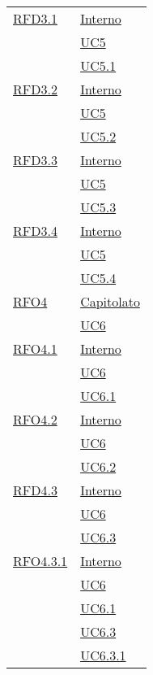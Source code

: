 \begin{longtable}{|>{\centering}m{5cm}|m{5cm}<{\centering}|}
\hyperlink{RFD3.1}{RFD3.1} 
& \hyperlink{Interno}{Interno}\\
& \hyperref[UC5]{UC5}\\
& \hyperref[UC5.1]{UC5.1}\\ \hline

\hyperlink{RFD3.2}{RFD3.2} 
& \hyperlink{Interno}{Interno}\\
& \hyperref[UC5]{UC5}\\
& \hyperref[UC5.2]{UC5.2}\\ \hline

\hyperlink{RFD3.3}{RFD3.3} 
& \hyperlink{Interno}{Interno}\\
& \hyperref[UC5]{UC5}\\
& \hyperref[UC5.3]{UC5.3}\\ \hline

\hyperlink{RFD3.4}{RFD3.4} 
& \hyperlink{Interno}{Interno}\\
& \hyperref[UC5]{UC5}\\
& \hyperref[UC5.4]{UC5.4}\\ \hline

\hyperlink{RFO4}{RFO4} 
& \hyperlink{Capitolato}{Capitolato}\\
& \hyperref[UC6]{UC6}\\ \hline

\hyperlink{RFO4.1}{RFO4.1} 
& \hyperlink{Interno}{Interno}\\
& \hyperref[UC6]{UC6}\\
& \hyperref[UC6.1]{UC6.1}\\ \hline

\hyperlink{RFO4.2}{RFO4.2} 
& \hyperlink{Interno}{Interno}\\
& \hyperref[UC6]{UC6}\\
& \hyperref[UC6.2]{UC6.2}\\ \hline

\hyperlink{RFD4.3}{RFD4.3} 
& \hyperlink{Interno}{Interno}\\
& \hyperref[UC6]{UC6}\\
& \hyperref[UC6.3]{UC6.3}\\ \hline

\hyperlink{RFO4.3.1}{RFO4.3.1} 
& \hyperlink{Interno}{Interno}\\
& \hyperref[UC6]{UC6}\\
& \hyperref[UC6.1]{UC6.1}\\
& \hyperref[UC6.3]{UC6.3}\\
& \hyperref[UC6.3.1]{UC6.3.1}\\ \hline


\end{longtable}
